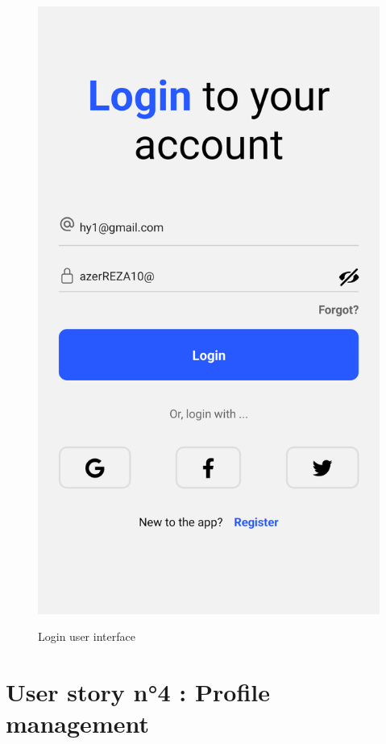 \begin{figure}[H]
\begin{minipage}{0.45\textwidth}
    \label{fig:login-form}
\end{minipage}\hfill
\begin{minipage}{0.45\textwidth}
    \centering
    \includegraphics[width=\linewidth]{images/chap2/LoginFormFilled.png}
    \label{fig:login-form-filled}
\end{minipage}
    \caption{Login user interface}
\end{figure}
\newpage
\section{User story n°4 : Profile management}
